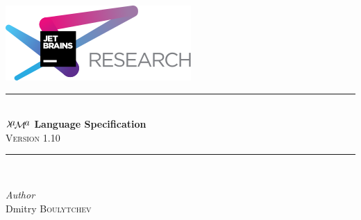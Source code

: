 \documentclass{book}
\newcommand{\lama}{$\lambda\kern -.1667em\lower -.5ex\hbox{$a$}\kern -.1000em\lower .2ex\hbox{$\mathcal M$}\kern -.1000em\lower -.5ex\hbox{$a$}$\xspace}
\begin{document}
\begin{titlepage} %
	\newcommand{\HRule}{\rule{\linewidth}{0.5mm}} %
	
	\center %
	

	\includegraphics[scale=0.5]{jetbrains.png}\\[3cm]
	
	
	
	
	\HRule\\[0.4cm]
	
	{\huge\bfseries \lama Language Specification}\\[0.4cm] %

        {\textsc{Version 1.10}}
        
	\HRule\\[1.5cm]
	
	
	\begin{minipage}{0.4\textwidth}
		\begin{flushleft}
			\large
			\textit{Author}\\
			Dmitry \textsc{Boulytchev} %
		\end{flushleft}
	\end{minipage}
	

\end{titlepage}
\end{document}
